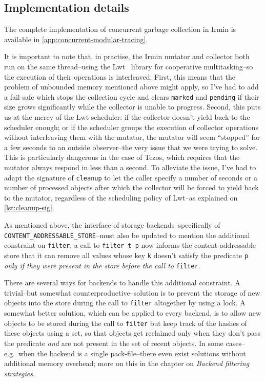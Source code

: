 \subsection{Implementation details}

The complete implementation of concurrent garbage collection in Irmin is available in \cref{app:concurrent-modular-tracing}.

It is important to note that, in practise, the Irmin mutator and collector both run on the same thread--using the Lwt~\cite{lwt-manual} library for cooperative multitasking--so the execution of their operations is interleaved. First, this means that the problem of unbounded memory mentioned above might apply, so I've had to add a fail-safe which stops the collection cycle and clears \texttt{marked} and \texttt{pending} if their size grows significantly while the collector is unable to progress. Second, this puts us at the mercy of the Lwt scheduler: if the collector doesn't yield back to the scheduler enough; or if the scheduler groups the execution of collector operations without interleaving them with the mutator, the mutator will seem ``stopped'' for a few seconds to an outside observer--the very issue that we were trying to solve. This is particularly dangerous in the case of Tezos, which requires that the mutator always respond in less than a second. To alleviate the issue, I've had to adapt the signature of \texttt{cleanup} to let the caller specify a number of seconds or a number of processed objects after which the collector will be forced to yield back to the mutator, regardless of the scheduling policy of Lwt--as explained on \cref{lst:cleanup-sig}.

\vspace{-.8em}

\vspace{-1.5em}

As mentioned above, the interface of storage backends--specifically of \texttt{CONTENT\_ADDRESSABLE\_STORE}--must also be updated to mention the additional constraint on \texttt{filter}: a call to \texttt{filter t p} now informs the content-addressable store that it can remove all values whose key \texttt{k} doesn't satisfy the predicate \texttt{p} \textit{only if they were present in the store before the call to} \texttt{filter}.

There are several ways for backends to handle this additional constraint. A trivial--but somewhat counterproductive--solution is to prevent the storage of new objects into the store during the call to \texttt{filter} altogether by using a lock. A somewhat better solution, which can be applied to every backend, is to allow new objects to be stored during the call to \texttt{filter} but keep track of the hashes of these objects using a set, so that objects get reclaimed only when they don't pass the predicate \emph{and} are not present in the set of recent objects. In some cases--e.g.~when the backend is a single pack-file--there even exist solutions without additional memory overhead; more on this in the chapter on \emph{Backend filtering strategies}.